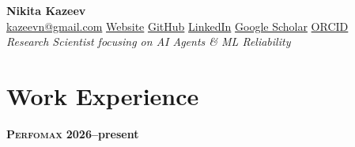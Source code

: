 \documentclass[11pt,a4paper]{article}
\begin{document}
\begin{center}
  {\LARGE\bfseries Nikita Kazeev}\\[3pt]
  {\small
    \href{mailto:kazeevn@gmail.com}{kazeevn@gmail.com} \textperiodcentered{}
    \href{https://kazeevn.github.io}{Website} \textperiodcentered{}
    \href{https://github.com/kazeevn}{GitHub} \textperiodcentered{}
    \href{https://linkedin.com/in/nikita-kazeev}{LinkedIn} \textperiodcentered{}
    \href{https://scholar.google.com/citations?user=vamy2okAAAAJ}{Google Scholar} \textperiodcentered{}
    \href{https://orcid.org/0000-0002-5699-7634}{ORCID}%
  }\\[5pt]
  \textit{ Research Scientist focusing on AI Agents \& ML Reliability }
\end{center}

\section{Work Experience}
\textsc{\textbf{\boldmath{}Perfomax}} \hfill\textbf{2026--present}\par
\smallskip
\end{document}
